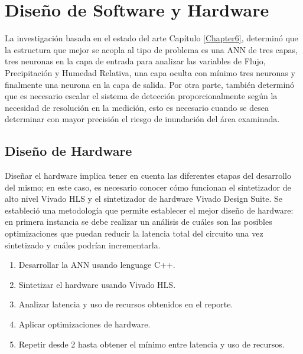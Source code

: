 
\chapter{Diseño de Software y Hardware} %
\label{Chapter10}

La investigación basada en el estado del arte Capítulo \ref{Chapter6}, determinó que la estructura que mejor se acopla al tipo de problema es una ANN de tres capas, tres neuronas en la capa de entrada para analizar las variables de Flujo, Precipitación y Humedad Relativa, una capa oculta con mínimo tres neuronas y finalmente una neurona en la capa de salida. Por otra parte, también determinó que es necesario escalar el sistema de detección proporcionalmente según la necesidad de resolución en la medición, esto es necesario cuando se desea determinar con mayor precisión el riesgo de inundación del área examinada.



\section{Diseño de Hardware}

Diseñar el hardware implica tener en cuenta las diferentes etapas del desarrollo del mismo; en este caso, es necesario conocer cómo funcionan el sintetizador de alto nivel Vivado HLS y el sintetizador de hardware Vivado Design Suite. Se estableció una metodología que permite establecer el mejor diseño de hardware: en primera instancia se debe realizar un análisis de cuáles son las posibles optimizaciones que puedan reducir la latencia total del circuito una vez sintetizado y cuáles podrían incrementarla.

\begin{enumerate}
\item Desarrollar la ANN usando lenguage C++.
\item Sintetizar el hardware usando Vivado HLS.
\item Analizar latencia y uso de recursos obtenidos en el reporte.
\item Aplicar optimizaciones de hardware.
\item Repetir desde 2 hasta obtener el mínimo entre latencia y uso de recursos.
\end{enumerate}

